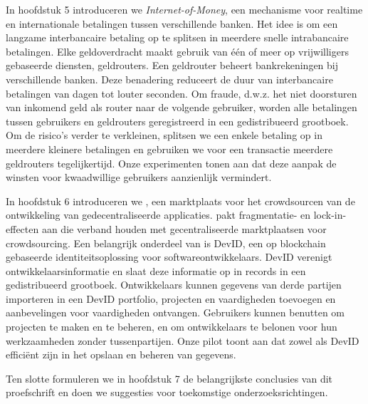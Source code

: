 {In hoofdstuk 5 introduceren we \emph{Internet-of-Money}, een mechanisme voor realtime en internationale betalingen tussen verschillende banken.
Het idee is om een ​​langzame interbancaire betaling op te splitsen in meerdere snelle intrabancaire betalingen.
Elke geldoverdracht maakt gebruik van één of meer op vrijwilligers gebaseerde diensten, geldrouters.
Een geldrouter beheert bankrekeningen bij verschillende banken.
Deze benadering reduceert de duur van interbancaire betalingen van dagen tot louter seconden.
Om fraude, d.w.z. het niet doorsturen van inkomend geld als router naar de volgende gebruiker, worden alle betalingen tussen gebruikers en geldrouters geregistreerd in een gedistribueerd grootboek.
Om de risico's verder te verkleinen, splitsen we een enkele betaling op in meerdere kleinere betalingen en gebruiken we voor een transactie meerdere geldrouters tegelijkertijd.
Onze experimenten tonen aan dat deze aanpak de winsten voor kwaadwillige gebruikers aanzienlijk vermindert.

In hoofdstuk 6 introduceren we \emph{\Dappcoder{}}, een marktplaats voor het crowdsourcen van de ontwikkeling van gedecentraliseerde applicaties.
\Dappcoder{} pakt fragmentatie- en lock-in-effecten aan die verband houden met gecentraliseerde marktplaatsen voor crowdsourcing.
Een belangrijk onderdeel van \Dappcoder{} is DevID, een op blockchain gebaseerde identiteitsoplossing voor softwareontwikkelaars.
DevID verenigt ontwikkelaarsinformatie en slaat deze informatie op in records in een gedistribueerd grootboek.
Ontwikkelaars kunnen gegevens van derde partijen importeren in een DevID portfolio, projecten en vaardigheden toevoegen en aanbevelingen voor vaardigheden ontvangen.
Gebruikers kunnen \Dappcoder{} benutten om projecten te maken en te beheren, en om ontwikkelaars te belonen voor hun werkzaamheden zonder tussenpartijen.
Onze pilot toont aan dat zowel \Dappcoder{} als DevID efficiënt zijn in het opslaan en beheren van gegevens.

Ten slotte formuleren we in hoofdstuk 7 de belangrijkste conclusies van dit proefschrift en doen we suggesties voor toekomstige onderzoeksrichtingen.
}




